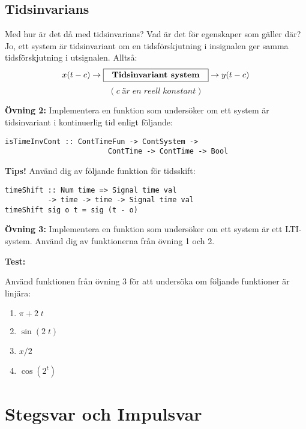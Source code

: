 \documentclass{article}
\begin{document}
\subsection{Tidsinvarians}
Med hur är det då med tidsinvarians? Vad är det för egenskaper som gäller
där? Jo, ett system är tidsinvariant om en tidsförskjutning i insignalen ger samma tidsförskjutning i utsignalen. Alltså:
$$x(t-c) \rightarrow \framebox[1.2\width]{\textbf{Tidsinvariant system}} \rightarrow y(t-c) $$
 $$(c\; är\; en\; reell\; konstant)$$

\textbf{Övning 2:} Implementera en funktion som undersöker om ett system är tidsinvariant i kontinuerlig tid enligt följande:

\begin{verbatim}
isTimeInvCont :: ContTimeFun -> ContSystem ->
                        ContTime -> ContTime -> Bool

\end{verbatim}

\textbf{Tips!} Använd dig av följande funktion för tidsskift:

\begin{verbatim}
timeShift :: Num time => Signal time val
          -> time -> time -> Signal time val
timeShift sig o t = sig (t - o)
\end{verbatim}

\textbf{Övning 3:} Implementera en funktion som undersöker om ett system är ett LTI-system. Använd dig av funktionerna från övning 1 och 2.

\textbf{Test:}


Använd funktionen från övning 3 för att undersöka om följande funktioner är linjära:
\begin{enumerate}
\item $\pi + 2\;t$
\item $\sin(2\;t)$
\item $x/2$
\item $\cos(2^t)$
\end{enumerate}

\section{Stegsvar och Impulsvar}
\end{document}
